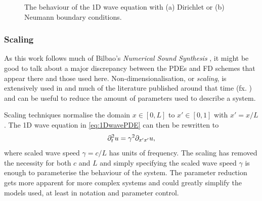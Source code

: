 \begin{figure}[t]
    \centering
    \hspace{0.06\textwidth}
    \caption{The behaviour of the 1D wave equation with (a) Dirichlet or (b) Neumann boundary conditions.\label{fig:boundaryCondsCont}}
\end{figure}

\subsubsection{Scaling}
As this work follows much of Bilbao's \textit{Numerical Sound Synthesis} \cite{theBible}, it might be good to talk about a major discrepancy between the PDEs and FD schemes that appear there and those used here. Non-dimensionalisation, or \textit{scaling}, is extensively used in \cite{theBible} and much of the literature published around that time (fx. \cite{Bilbao2009Modular,Bilbao2009spring}) and can be useful to reduce the amount of parameters used to describe a system.

Scaling techniques normalise the domain $x\in[0, L]$ to $x' \in [0, 1]$ with $x' = x/L$ . The 1D wave equation in \eqref{eq:1DwavePDE} can then be rewritten to
\begin{equation}\label{eq:scaled1Dwave}
    \partial_t^2 u = \gamma^2\partial_{x'x'}u,
\end{equation}
where scaled wave speed $\gamma = c/L$ has units of frequency. The scaling has removed the necessity for both $c$ and $L$ and simply specifying the scaled wave speed $\gamma$ is enough to parameterise the behaviour of the system. The parameter reduction gets more apparent for more complex systems and could greatly simplify the models used, at least in notation and parameter control. 

